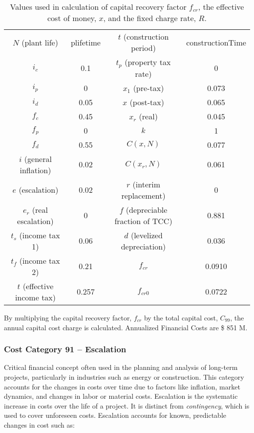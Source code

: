 \begin{table}
    \centering
    \begin{tabular}{cc|cc}
    \hline
      $N$ (plant life)  & plifetime & $t$ (construction period) & constructionTime\\
       $i_c$  & 0.1 & $t_p$ (property tax rate)& 0\\
        $i_p$ & 0 & $x_1$ (pre-tax)& 0.073\\
        $i_d$ & 0.05 & $x$ (post-tax)& 0.065\\
        $f_c$ & 0.45 & $x_r$ (real)& 0.045\\
        $f_p$ & 0 & $k$ & 1\\
        $f_d$ & 0.55 & $C(x,N)$ & 0.077\\
        $i$ (general inflation) & 0.02 & $C(x_r,N)$ & 0.061\\
        $e$  (escalation)& 0.02 & $r$ (interim replacement)& 0\\
        $e_r$ (real escalation) & 0 & $f$ (depreciable fraction of TCC)& 0.881\\
        $t_s$ (income tax 1) & 0.06 & $d$ (levelized depreciation)& 0.036\\
        $t_f$ (income tax 2) & 0.21 & $f_{cr}$ & 0.0910\\
        $t$ (effective income tax) & 0.257 & $f_{cr0}$ & 0.0722\\
    \hline    
    \end{tabular}
    \caption{Values used in calculation of capital recovery factor  $f_{cr}$, the effective cost of money, $x$, and the fixed charge rate, $R$.}
    \label{tab:ec_vals}
    \label{tab:my_label}
\end{table}

By multiplying the capital recovery factor, $f_{cr}$ by the total capital cost, $C_{99}$, the annual capital cost charge is calculated.
Annualized Financial Costs are \$ 851 M.

\subsubsection*{Cost Category 91 – Escalation}
Critical financial concept often used in the planning and analysis of long-term projects, particularly in industries such as energy or construction. This category accounts for the changes in costs over time due to factors like inflation, market dynamics, and changes in labor or material costs. Escalation is the systematic increase in costs over the life of a project. It is distinct from \textit{contingency}, which is used to cover unforeseen costs. Escalation accounts for known, predictable changes in cost such as:

